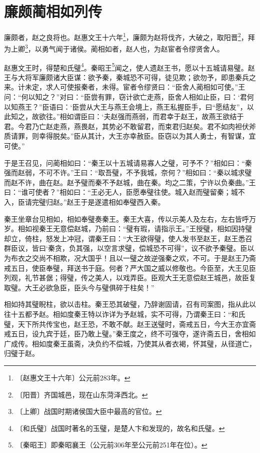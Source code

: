 \documentclass[12pt,UTF-8,openany]{ctexbook}
\begin{document}
\chapter{廉颇蔺相如列传}

\begin{normalsize}
    
    廉颇者，赵之良将也。赵惠文王十六年\footnote{〔赵惠文王十六年〕公元前283年。}，廉颇为赵将伐齐，大破之，取阳晋\footnote{〔阳晋〕齐国城邑，现在山东菏泽西北。}，拜为上卿\footnote{〔上卿〕战国时期诸侯国大臣中最高的官位。}，以勇气闻于诸侯。蔺相如者，赵人也，为赵宦者令缪贤舍人。
    
    赵惠文王时，得楚和氏璧\footnote{〔和氏璧〕战国时著名的玉璧，是楚人卞和发现的，故名和氏璧。}。秦昭王\footnote{〔秦昭王〕即秦昭襄王（公元前306年至公元前251年在位）。}闻之，使人遗赵王书，愿以十五城请易璧。赵王与大将军廉颇诸大臣谋：欲予秦，秦城恐不可得，徒见欺；欲勿予，即患秦兵之来。计未定，求人可使报秦者，未得。宦者令缪贤曰：“臣舍人蔺相如可使。”王问：“何以知之？”对曰：“臣尝有罪，窃计欲亡走燕，臣舍人相如止臣，曰：‘君何以知燕王？”臣语曰：‘臣尝从大王与燕王会境上，燕王私握臣手，曰“愿结友”，以此知之，故欲往。”相如谓臣曰：‘夫赵强而燕弱，而君幸于赵王，故燕王欲结于君。今君乃亡赵走燕，燕畏赵，其势必不敢留君，而束君归赵矣。君不如肉袒伏斧质请罪，则幸得脱矣。”臣从其计，大王亦幸赦臣。臣窃以为其人勇士，有智谋，宜可使。”
    
    于是王召见，问蔺相如曰：“秦王以十五城请易寡人之璧，可予不？”相如曰：“秦强而赵弱，不可不许。”王曰：“取吾璧，不予我城，奈何？”相如曰：“秦以城求璧而赵不许，曲在赵。赵予璧而秦不予赵城，曲在秦。均之二策，宁许以负秦曲。”王曰：“谁可使者？”相如曰：“王必无人，臣愿奉璧往使。城入赵而璧留秦；城不入，臣请完璧归赵。”赵王于是遂遣相如奉璧西入秦。
    
    秦王坐章台见相如，相如奉璧奏秦王。秦王大喜，传以示美人及左右，左右皆呼万岁。相如视秦王无意偿赵城，乃前曰：“璧有瑕，请指示王。”王授璧，相如因持璧却立，倚柱，怒发上冲冠，谓秦王曰：“大王欲得璧，使人发书至赵王，赵王悉召群臣议，皆曰‘秦贪，负其强，以空言求璧，偿城恐不可得”，议不欲予秦璧。臣以为布衣之交尚不相欺，况大国乎！且以一璧之故逆强秦之欢，不可。于是赵王乃斋戒五日，使臣奉璧，拜送书于庭。何者？严大国之威以修敬也。今臣至，大王见臣列观，礼节甚倨；得璧，传之美人，以戏弄臣。臣观大王无意偿赵王城邑，故臣复取璧。大王必欲急臣，臣头今与璧俱碎于柱矣！”
    
    相如持其璧睨柱，欲以击柱。秦王恐其破璧，乃辞谢固请，召有司案图，指从此以往十五都予赵。相如度秦王特以诈详为予赵城，实不可得，乃谓秦王曰：“和氏璧，天下所共传宝也，赵王恐，不敢不献。赵王送璧时，斋戒五日，今大王亦宜斋戒五日，设九宾于廷，臣乃敢上璧。”秦王度之，终不可强夺，遂许斋五日，舍相如广成传。相如度秦王虽斋，决负约不偿城，乃使其从者衣褐，怀其璧，从径道亡，归璧于赵。
    

\end{normalsize}
\end{document}
